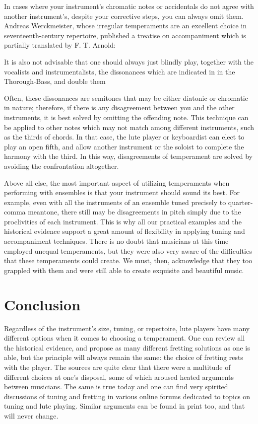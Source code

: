 In cases where your instrument's chromatic notes or accidentals do not agree with another
instrument's, despite your corrective steps, you can always omit them. Andreas
Werckmeister, whose irregular temperaments are an excellent choice in seventeenth-century repertoire,
published a treatise on accompaniment which is partially translated by F. T. Arnold:
\begin{blocks}
It is also not advisable that one should always just blindly play, together with the vocalists
and instrumentalists, the dissonances which are indicated in in the Thorough-Bass, and double
them
\autocite[210]{FTA:1}
\end{blocks}
Often, these dissonances are semitones that may be either diatonic or chromatic
in nature; therefore, if there is any disagreement between you and the other
instruments, it is best solved by omitting the offending note. This technique
can be applied to other notes which may not match among different
instruments, such as the thirds of chords. In that case, the lute player or
keyboardist can elect to play an open fifth, and allow another instrument or the
soloist to complete the harmony with the third. In this way, disagreements of
temperament are solved by avoiding the confrontation altogether.

Above all else, the most important aspect of utilizing temperaments when performing with ensembles is that your
instrument should sound its best. For example, even with all the instruments of an ensemble tuned precisely to quarter-
comma meantone, there still may be disagreements in pitch simply due to the proclivities of each instrument. This is why
all our practical examples and the historical evidence support a great amount of flexibility in applying tuning and
accompaniment techniques. There is no doubt that musicians at this time employed unequal temperaments, but they were
also very aware of the difficulties that these temperaments could create. We must, then, acknowledge that they too
grappled with them and were still able to create exquisite and beautiful music.

\section{Conclusion}

Regardless of the instrument's size, tuning, or repertoire, lute players have many different options when it comes to
choosing a temperament. One can review all the historical evidence, and propose as many different fretting solutions as
one is able, but the principle will always remain the same: the choice of fretting rests with the player. The sources
are quite clear that there were a multitude of different choices at one's disposal, some of which aroused heated
arguments between musicians. The same is true today and one can find very spirited discussions of tuning and fretting in
various online forums dedicated to topics on tuning and lute playing. Similar arguments can be found in print too, and
that will never change. \autocite{DD:4}

